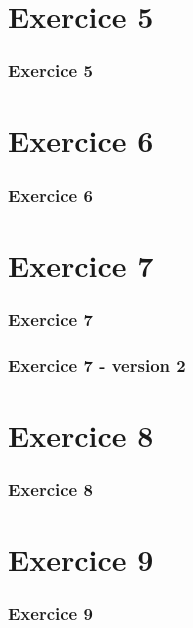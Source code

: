 \documentclass[svgnames,11pt]{beamer}
\begin{document}
\section{Exercice 5}
\begin{frame}
    \frametitle{Exercice 5}

    

\end{frame}
\section{Exercice 6}
\begin{frame}
    \frametitle{Exercice 6}

    

\end{frame}
\section{Exercice 7}
\begin{frame}
    \frametitle{Exercice 7}

    

\end{frame}
\begin{frame}
    \frametitle{Exercice 7 - version 2}

    

\end{frame}
\section{Exercice 8}
\begin{frame}
    \frametitle{Exercice 8}

    

\end{frame}
\section{Exercice 9}
\begin{frame}
    \frametitle{Exercice 9}

    

\end{frame}
\end{document}
